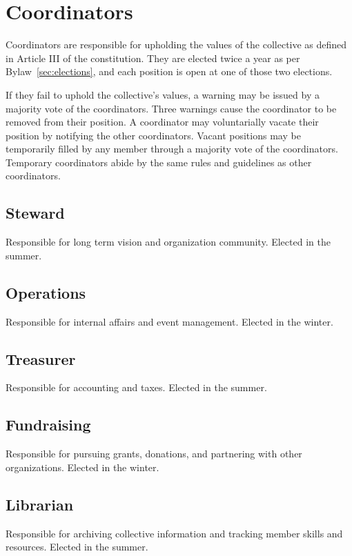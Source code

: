 \chapter{Coordinators}\label{sec:coordinators}

Coordinators are responsible for upholding the values of the collective as defined in Article III of the constitution. They are elected twice a year as per Bylaw~\ref{sec:elections}, and each position is open at one of those two elections.

If they fail to uphold the collective's values, a warning may be issued by a majority vote of the coordinators. Three warnings cause the coordinator to be removed from their position. A coordinator may voluntarially vacate their position by notifying the other coordinators. Vacant positions may be temporarily filled by any member through a majority vote of the coordinators. Temporary coordinators abide by the same rules and guidelines as other coordinators.

\section{Steward}\label{sec:steward}
Responsible for long term vision and organization community. Elected in the summer.

\section{Operations}\label{sec:operations}
Responsible for internal affairs and event management. Elected in the winter.

\section{Treasurer}\label{sec:treasurer}
Responsible for accounting and taxes. Elected in the summer.

\section{Fundraising}\label{sec:fundraising}
Responsible for pursuing grants, donations, and partnering with other organizations. Elected in the winter.

\section{Librarian}\label{sec:librarian}
Responsible for archiving collective information and tracking member skills and resources. Elected in the summer.

